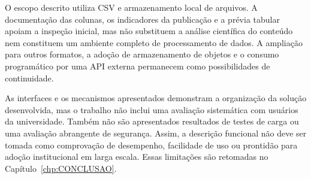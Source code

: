 O escopo descrito utiliza CSV e armazenamento local de arquivos. A documentação das colunas, os indicadores da publicação e a prévia tabular apoiam a inspeção inicial, mas não substituem a análise científica do conteúdo nem constituem um ambiente completo de processamento de dados. A ampliação para outros formatos, a adoção de armazenamento de objetos e o consumo programático por uma API externa permanecem como possibilidades de continuidade.

As interfaces e os mecanismos apresentados demonstram a organização da solução desenvolvida, mas o trabalho não inclui uma avaliação sistemática com usuários da universidade. Também não são apresentados resultados de testes de carga ou uma avaliação abrangente de segurança. Assim, a descrição funcional não deve ser tomada como comprovação de desempenho, facilidade de uso ou prontidão para adoção institucional em larga escala. Essas limitações são retomadas no Capítulo~\ref{chp:CONCLUSAO}.
